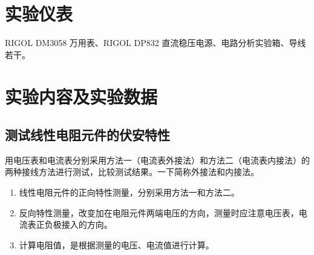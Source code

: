 \documentclass[a4paper,utf8]{article}
\begin{document}
\section{实验仪表}
    RIGOL DM3058 万用表、RIGOL DP832 直流稳压电源、电路分析实验箱、导线若干。
\section{实验内容及实验数据}
    \subsection{测试线性电阻元件的伏安特性}
    用电压表和电流表分别采用方法一（电流表外接法）和方法二（电流表内接法）的两种接线方法进行测试，比较测试结果。一下简称外接法和内接法。
    \begin{enumerate}
        \item 线性电阻元件的正向特性测量，分别采用方法一和方法二。
        \item 反向特性测量，改变加在电阻元件两端电压的方向，测量时应注意电压表，电流表正负极接入的方向。
        \item 计算电阻值，是根据测量的电压、电流值进行计算。
    \end{enumerate}
\end{document}
